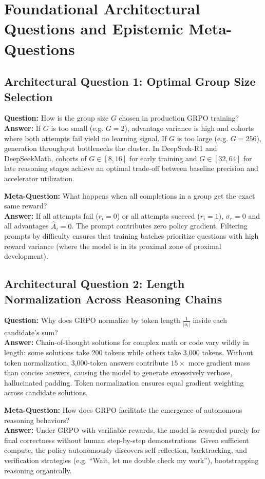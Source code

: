 \documentclass[11pt,a4paper]{article}
\theoremstyle{definition}
\begin{document}
\section{Foundational Architectural Questions and Epistemic Meta-Questions}

\subsection{Architectural Question 1: Optimal Group Size Selection}
\textbf{Question:} How is the group size $G$ chosen in production GRPO training?\\
\textbf{Answer:} If $G$ is too small (e.g. $G = 2$), advantage variance is high and cohorts where both attempts fail yield no learning signal. If $G$ is too large (e.g. $G = 256$), generation throughput bottlenecks the cluster. In DeepSeek-R1 and DeepSeekMath, cohorts of $G \in [8, 16]$ for early training and $G \in [32, 64]$ for late reasoning stages achieve an optimal trade-off between baseline precision and accelerator utilization.

\textbf{Meta-Question:} What happens when all completions in a group get the exact same reward?\\
\textbf{Answer:} If all attempts fail ($r_i = 0$) or all attempts succeed ($r_i = 1$), $\sigma_r = 0$ and all advantages $\hat{A}_i = 0$. The prompt contributes zero policy gradient. Filtering prompts by difficulty ensures that training batches prioritize questions with high reward variance (where the model is in its proximal zone of proximal development).

\subsection{Architectural Question 2: Length Normalization Across Reasoning Chains}
\textbf{Question:} Why does GRPO normalize by token length $\frac{1}{|o_i|}$ inside each candidate's sum?\\
\textbf{Answer:} Chain-of-thought solutions for complex math or code vary wildly in length: some solutions take 200 tokens while others take 3,000 tokens. Without token normalization, 3,000-token answers contribute $15\times$ more gradient mass than concise answers, causing the model to generate excessively verbose, hallucinated padding. Token normalization ensures equal gradient weighting across candidate solutions.

\textbf{Meta-Question:} How does GRPO facilitate the emergence of autonomous reasoning behaviors?\\
\textbf{Answer:} Under GRPO with verifiable rewards, the model is rewarded purely for final correctness without human step-by-step demonstrations. Given sufficient compute, the policy autonomously discovers self-reflection, backtracking, and verification strategies (e.g. ``Wait, let me double check my work''), bootstrapping reasoning organically.
\end{document}
